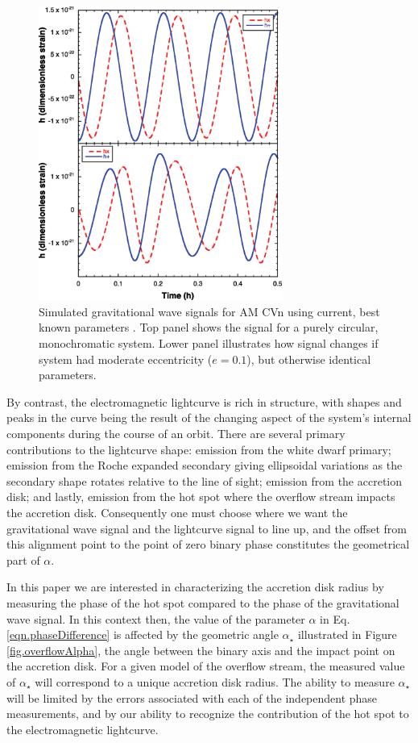 \documentclass[preprint2]{aastex}
\begin{document}
\begin{figure}[t!]
  \centering
  \includegraphics[width=80mm]{./plotAMCVn.eps} 
  \caption{{\small Simulated gravitational wave signals for AM CVn 
  using current, best known parameters \cite{NelemansWiki}.  Top 
  panel shows the signal for a purely circular, monochromatic system. 
  Lower panel illustrates how signal changes if system had moderate 
  eccentricity ($e = 0.1$), but otherwise identical parameters.}}
  \label{fig.gwSignals}
\end{figure}

By contrast, the electromagnetic lightcurve is rich in structure, 
with shapes and peaks in the curve being the result of the changing 
aspect of the system's internal components during the course of an 
orbit. There are several primary contributions to the lightcurve 
shape: emission from the white dwarf primary; emission from the Roche 
expanded secondary giving ellipsoidal variations as the secondary 
shape rotates relative to the line of sight; emission from the 
accretion disk; and lastly, emission from the hot spot where the 
overflow stream impacts the accretion disk. Consequently one must choose where we want the gravitational wave signal and the lightcurve signal to line up, and the offset from this alignment point to the point of zero binary phase constitutes the geometrical part of $\alpha$.

In this paper we are interested in characterizing the accretion disk radius
by measuring the phase of the hot spot compared to the phase of the
gravitational wave signal. In this context then, the value of the
parameter $\alpha$ in Eq. \ref{eqn.phaseDifference} is affected by the geometric angle $\alpha_{\star}$ illustrated in Figure
\ref{fig.overflowAlpha}, the angle between the binary axis and the
impact point on the accretion disk. For a given model of the overflow
stream, the measured value of $\alpha_{\star}$ will correspond to a unique
accretion disk radius.  The ability to measure $\alpha_{\star}$ will be
limited by the errors associated with each of the independent phase
measurements, and by our ability to recognize the contribution of the
hot spot to the electromagnetic lightcurve.
\end{document}
